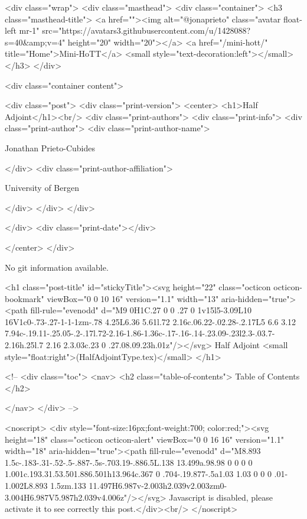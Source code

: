     <div class="wrap">
      <div class="masthead">
        <div class="container">
          <h3 class="masthead-title">
            <a href=""><img alt="@jonaprieto" class="avatar float-left mr-1" src="https://avatars3.githubusercontent.com/u/1428088?s=40&amp;v=4" height="20" width="20"></a>
            <a href="/mini-hott/" title="Home">Mini-HoTT</a>
            <small style="text-decoration:left"></small>
          </h3>
        </div>
      
      <div class="container content">
        







<div class="post">
  <div class="print-version">
    <center>
      <h1>Half Adjoint</h1><br/>
        <div class="print-authors">
          <div class="print-info">
            <div class="print-author">
              <div class="print-author-name">
                
                  Jonathan Prieto-Cubides
                
              </div>
              <div class="print-author-affiliation">
                
                  University of Bergen
                
                </div>
            </div>
          </div>
          
          
        </div>
        <div class="print-date"></div>
        
        
    </center>
  </div>

  
  No git information available.
  

  <h1 class="post-title" id="stickyTitle"><svg height="22" class="octicon octicon-bookmark" viewBox="0 0 10 16" version="1.1" width="13" aria-hidden="true"><path fill-rule="evenodd" d="M9 0H1C.27 0 0 .27 0 1v15l5-3.09L10 16V1c0-.73-.27-1-1-1zm-.78 4.25L6.36 5.61l.72 2.16c.06.22-.02.28-.2.17L5 6.6 3.12 7.94c-.19.11-.25.05-.2-.17l.72-2.16-1.86-1.36c-.17-.16-.14-.23.09-.23l2.3-.03.7-2.16h.25l.7 2.16 2.3.03c.23 0 .27.08.09.23h.01z"/></svg> Half Adjoint <small style="float:right">(HalfAdjointType.tex)</small>
  </h1>

  <!-- 
  <div class="toc">
    <nav>
    <h2 class="table-of-contents"> Table of Contents </h2>
      

    </nav>
  </div>
   -->

  <noscript>
  <div style="font-size:16px;font-weight:700; color:red;"><svg height="18" class="octicon octicon-alert" viewBox="0 0 16 16" version="1.1" width="18" aria-hidden="true"><path fill-rule="evenodd" d="M8.893 1.5c-.183-.31-.52-.5-.887-.5s-.703.19-.886.5L.138 13.499a.98.98 0 0 0 0 1.001c.193.31.53.501.886.501h13.964c.367 0 .704-.19.877-.5a1.03 1.03 0 0 0 .01-1.002L8.893 1.5zm.133 11.497H6.987v-2.003h2.039v2.003zm0-3.004H6.987V5.987h2.039v4.006z"/></svg> Javascript is disabled, please activate it to see correctly this post.</div><br/>
  </noscript>

